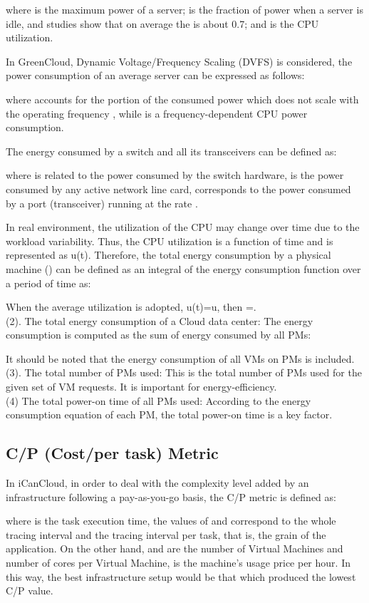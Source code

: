 \documentclass[3p, twocolumn]{elsarticle}
\begin{document}
where  is the maximum power of a server;  is the fraction of power when a server is idle, and studies show that on average the  is about 0.7; and  is the CPU utilization.


In GreenCloud, Dynamic Voltage/Frequency Scaling (DVFS) is considered, the power consumption of an average server can be expressed as follows:

where  accounts for the portion of the consumed power which does not scale with the operating frequency , while  is a frequency-dependent CPU power consumption.

The energy consumed by a switch and all its transceivers can be defined as:

where  is related to the power consumed by the switch hardware,  is the power consumed by any active network line card,  corresponds to the power consumed by a port (transceiver) running at the rate .

In real environment, the utilization of the CPU may change over time due to the workload variability. Thus, the CPU utilization is a function of time and is represented as u(t). Therefore, the total energy consumption by a physical machine () can be defined as an integral of the energy consumption function over a period of time as:

When the average utilization is adopted, u(t)=u, then =.\\
(2). The total energy consumption of a Cloud data center: The energy consumption is computed as the sum of energy consumed by all PMs:

It should be noted that the energy consumption of all VMs on PMs is included. \\
(3). The total number of PMs used: This is the total number of PMs used for the given set of VM requests. It is important for energy-efficiency.\\
(4) The total power-on time of all PMs used: According to the energy consumption equation of each PM, the total power-on time is a key factor. \\


\subsection{C/P (Cost/per task) Metric}
In iCanCloud, in order to deal with the complexity level added by an infrastructure following a pay-as-you-go basis, the C/P metric is defined as:

where  is the task execution time, the values of  and  correspond to the whole tracing interval and the tracing interval per task, that is, the grain of the application. On the other hand,  and  are the number of Virtual Machines and number of cores per Virtual Machine,  is the machine's usage price per hour. In this way, the best infrastructure setup would be that which produced the lowest C/P value.
\end{document}
